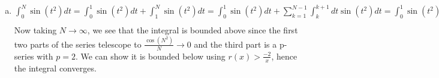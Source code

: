\documentclass{article}
\begin{document}
\begin{enumerate}
\begin{enumerate}[(a)]
\item $\displaystyle\int_{0}^{N} \sin(t^2) dt =\int_{0}^{1} \sin(t^2) dt+\int_{1}^{N} \sin(t^2) dt=\int_{0}^{1} \sin(t^2) dt+\sum_{k=1}^{N-1} \int_{k}^{k+1} dt \sin (t^2) dt=\int_{0}^{1} \sin(t^2) dt+\sum_{k=1}^{N-1} f(k-1) < \int_{0}^{1} \sin(t^2) dt+\sum_{k=1}^{N-1} \frac{1}{2}\left(\frac{\cos(k^2)-\cos[(k+1)^2]}{k}+\frac{2}{k^2}\right)< \int_{0}^{1} \sin(t^2) dt+\frac{1}{2}\sum_{k=1}^{N-1} \frac{\cos(k^2)}k - \frac{\cos[(k+1)^2]}{k+1} + \frac{2}{k^2}$ Now taking $N\rightarrow\infty$, we see that the integral is bounded above since the first two parts of the series telescope to $\frac{\cos (N^2)}{N} \rightarrow 0$ and the third part is a p-series with $p=2$. We can show it is bounded below using $r(x) > \frac{-2}{x}$, hence the integral converges.
\end{enumerate}
\end{enumerate}
\end{document}
